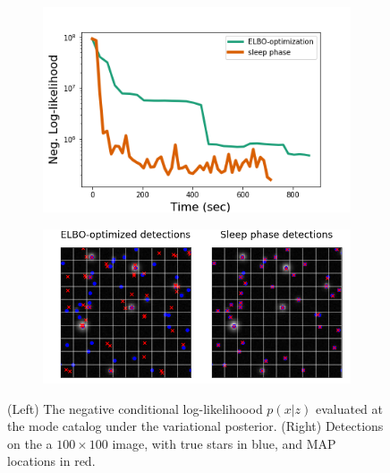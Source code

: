 \begin{figure}[!htb]
    \centering
    \begin{subfigure}[!t]{0.4\textwidth}
    \centering
    \includegraphics[width=\textwidth]{figures/optim_path_compare_100x100.png}
    \end{subfigure}
    \begin{subfigure}[!t]{0.59\textwidth}
    \centering
    \includegraphics[width=\textwidth]{figures/optim_path_detect_compare_100x100.png}
    \end{subfigure}
    \caption{(Left) The negative conditional log-likelihoood $p(x|z)$ evaluated at the mode catalog under the variational posterior. (Right) Detections on the a $100\times 100$ image, with true stars in blue, and MAP locations in red. }
    \label{fig:sim_data100x100}
\end{figure}
